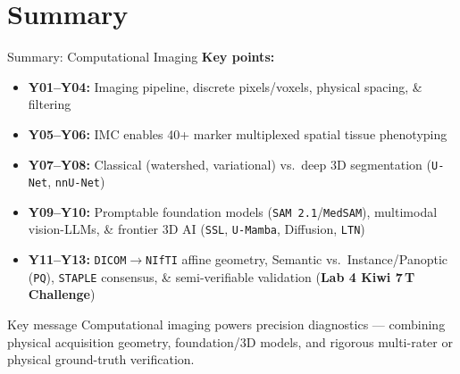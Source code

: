 \documentclass[aspectratio=169, 10pt]{beamer}
\begin{document}
\section*{Summary}

\begin{frame}{Summary: Computational Imaging}
    \textbf{Key points:}
    \begin{itemize}\footnotesize
        \item \textbf{Y01--Y04:} Imaging pipeline, discrete pixels/voxels, physical spacing, \& filtering
        \item \textbf{Y05--Y06:} IMC enables 40+ marker multiplexed spatial tissue phenotyping
        \item \textbf{Y07--Y08:} Classical (watershed, variational) vs.\ deep 3D segmentation (\texttt{U-Net}, \texttt{nnU-Net})
        \item \textbf{Y09--Y10:} Promptable foundation models (\texttt{SAM\,2.1}/\texttt{MedSAM}), multimodal vision-LLMs, \& frontier 3D AI (\texttt{SSL}, \texttt{U-Mamba}, Diffusion, \texttt{LTN})
        \item \textbf{Y11--Y13:} \texttt{DICOM$\to$NIfTI} affine geometry, Semantic vs.\ Instance/Panoptic (\texttt{PQ}), \texttt{STAPLE} consensus, \& semi-verifiable validation (\textbf{Lab 4 Kiwi 7\,T Challenge})
    \end{itemize}

    \vspace{0.15cm}
    \begin{block}{\footnotesize Key message}
        \footnotesize Computational imaging powers precision diagnostics --- combining physical acquisition geometry, foundation/3D models, and rigorous multi-rater or physical ground-truth verification.
    \end{block}
\end{frame}
\end{document}
